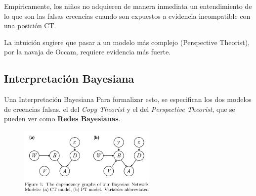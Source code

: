 \documentclass{beamer}
\begin{document}
\begin{frame}

Empiricamente, los niños no adquieren de manera inmediata un entendimiento de lo que son las falsas creencias cuando son expuestos a evidencia incompatible con una posición CT\@.

La intuición sugiere que pasar a un modelo más complejo (Perspective Theorist), por la navaja de Occam, requiere evidencia más fuerte.
\end{frame}

\subsection{Interpretación Bayesiana}

\begin{frame}[fragile]{Una Interpretación Bayesiana}
Para formalizar esto, se especifican los dos modelos de creencias falsas, el del \textit{Copy Theorist} y el del \textit{Perspective Theorist}, que se pueden ver como \textbf{Redes Bayesianas}.

\begin{figure}[h!]
  \centering
    \includegraphics[width=0.6\textwidth]{imagenes/modelos.jpg}
\end{figure}
\end{frame}
\end{document}
